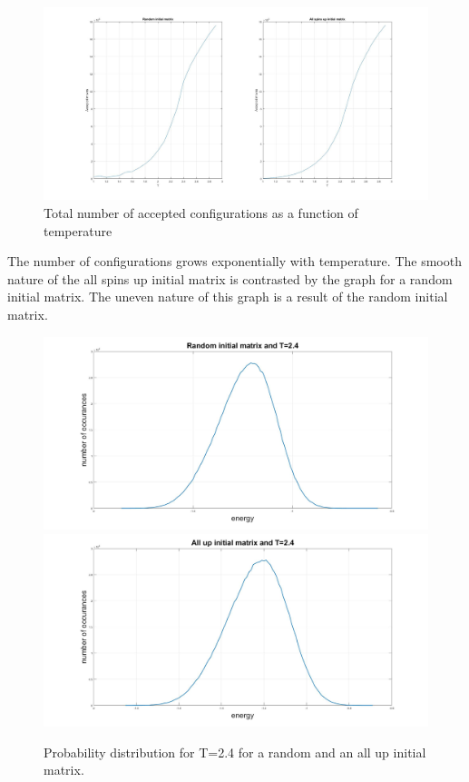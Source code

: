 \documentclass[10pt,a4paper]{article}
\begin{document}
\newpage 
\begin{figure}
\centerline{
\includegraphics[scale=0.275]{accept.jpg}
}
\caption{Total number of accepted configurations as a function of temperature}
\label{fig:Accept}
\end{figure}
\noindent The number of configurations grows exponentially with temperature. The smooth nature of the all spins up initial matrix is contrasted by the graph for a random initial matrix. The uneven nature of this graph is a result of the random initial matrix. 


\begin{figure}
\centerline{
\includegraphics[scale=0.15]{OccurancesRandom.jpg}
\includegraphics[scale=0.15]{OccurancesUp.jpg}
}
\caption{Probability distribution for T=2.4 for a random and an all up initial matrix.}
\label{fig:ProbBoth}
\end{figure}
\end{document}
